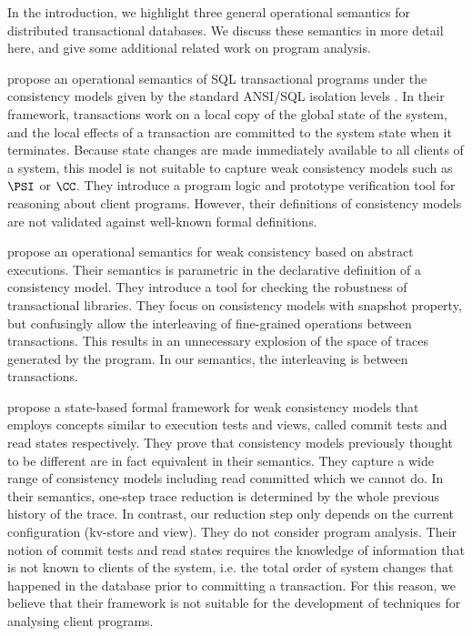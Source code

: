 In the introduction, we highlight three general operational semantics for 
distributed transactional databases. We discuss these semantics in more detail here,
and give some additional related work on program analysis. 

\citet{alonetogether} propose an operational semantics of SQL transactional programs 
under the consistency models given by the standard ANSI/SQL isolation levels \cite{si}.
In their  framework, transactions work on a local copy of the global state 
of the system, and the local effects of a transaction are committed to the  
system state when it terminates. Because state changes 
are made immediately available to all clients of a system, this model 
is not suitable to capture weak consistency models such as \(\PSI\) or \(\CC\). 
They introduce a program logic and prototype verification tool for reasoning 
about client programs. However, their definitions of consistency models 
are not validated against well-known formal definitions.

\citet{sureshConcur} propose an operational semantics for weak consistency 
based on abstract executions. Their semantics 
is parametric in the declarative definition of a consistency model. 
They introduce a tool for checking the robustness of transactional  
libraries.
They focus on consistency models with snapshot property, but confusingly allow 
the interleaving of fine-grained operations between transactions. 
This results in an unnecessary explosion of the space of traces generated by 
the program. In our semantics, the interleaving is between transactions.

\citet{seebelieve} propose a state-based formal framework for weak
consistency models 
that employs concepts  similar to execution tests and views, called commit tests and read states 
respectively.
They prove that consistency models previously thought to be different 
are in fact equivalent in their semantics.
They capture 
a wide range of consistency models including read committed which we cannot do. 
In their semantics, one-step trace reduction is determined by the whole previous history of the trace. 
In contrast, our reduction step only depends on the current configuration (kv-store and view).
They do not consider program analysis. Their notion of commit tests and read states requires 
the knowledge of information that is not known to clients of the system, i.e. the total order of system changes that happened in the database 
prior to committing a transaction. For this reason, we believe that
their framework is not suitable for the development of techniques for
analysing client programs. 

